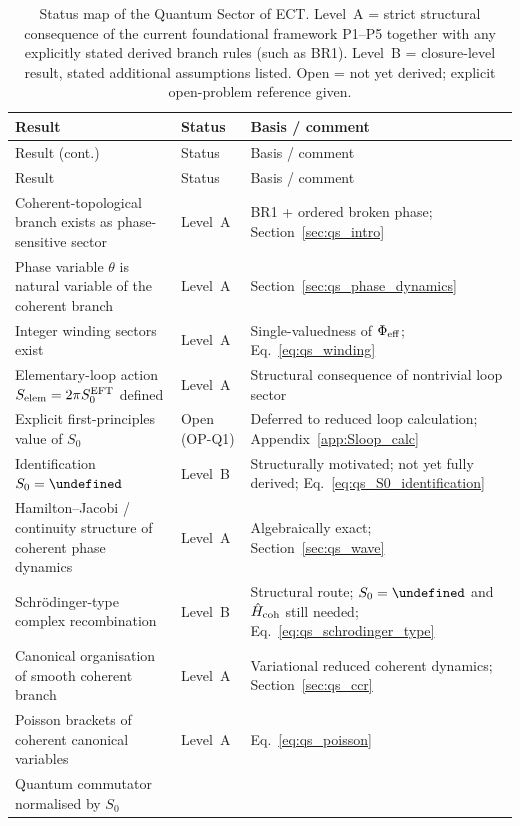 \documentclass[11pt,a4paper]{article}
\let\hbar\undefined
\numberwithin{equation}{section}
\begin{document}
{
\small
\renewcommand{\arraystretch}{1.35}
\begin{longtable}{p{6.0cm}p{2.4cm}p{4.5cm}}
\caption{Status map of the Quantum Sector of ECT.
Level~A = strict structural consequence of the current foundational
framework P1--P5 together with any explicitly stated derived branch rules
(such as BR1).
Level~B = closure-level result, stated additional assumptions
listed.
Open = not yet derived; explicit open-problem reference given.}
\label{tab:qs_status}\\
\hline\hline
Result & Status & Basis / comment \\
\hline
\endfirsthead
\hline\hline
Result (cont.) & Status & Basis / comment \\
\hline
\endhead
\hline
\endfoot
\hline\hline
\endlastfoot
Result & Status & Basis / comment \\
\hline
Coherent-topological branch exists as phase-sensitive sector
  & Level~A
  & BR1 + ordered broken phase; Section~\ref{sec:qs_intro} \\
Phase variable $\theta$ is natural variable of the coherent branch
  & Level~A
  & Section~\ref{sec:qs_phase_dynamics} \\
Integer winding sectors exist
  & Level~A
  & Single-valuedness of $\Phi_{\rm eff}$;
    Eq.~\eqref{eq:qs_winding} \\
Elementary-loop action $S_{\rm elem}=2\pi S_0^{\rm EFT}$ defined
  & Level~A
  & Structural consequence of nontrivial loop sector \\
Explicit first-principles value of $S_0$
  & Open (OP-Q1)
  & Deferred to reduced loop calculation;
    Appendix~\ref{app:Sloop_calc} \\
Identification $S_0=\hbar$
  & Level~B
  & Structurally motivated; not yet fully derived;
    Eq.~\eqref{eq:qs_S0_identification} \\
Hamilton--Jacobi / continuity structure of coherent phase dynamics
  & Level~A
  & Algebraically exact; Section~\ref{sec:qs_wave} \\
Schr\"odinger-type complex recombination
  & Level~B
  & Structural route; $S_0=\hbar$ and $\hat H_{\rm coh}$ still needed;
    Eq.~\eqref{eq:qs_schrodinger_type} \\
Canonical organisation of smooth coherent branch
  & Level~A
  & Variational reduced coherent dynamics;
    Section~\ref{sec:qs_ccr} \\
Poisson brackets of coherent canonical variables
  & Level~A
  & Eq.~\eqref{eq:qs_poisson} \\
Quantum commutator normalised by $S_0$

\end{longtable}}
\end{document}
